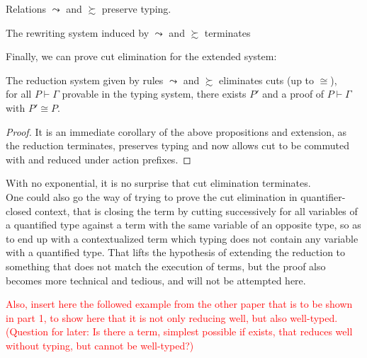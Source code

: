 \begin{corollary}
Relations $\leadsto$ and $\succsim$ preserve typing.
\end{corollary}

\begin{corollary}
The rewriting system induced by $\leadsto$ and $\succsim$ terminates
\end{corollary}

Finally, we can prove cut elimination for the extended system:

\begin{proposition}
The reduction system given by rules $\leadsto$ and $\succsim$ eliminates cuts (up to $\cong$),\\
\ie for all $P\vdash\Gamma$ provable in the typing system, there exists $P'$ and a proof of $P\vdash\Gamma$ with $P'\cong P$.
\end{proposition}

\begin{proof}
It is an immediate corollary of the above propositions and extension, as the reduction terminates, preserves typing and now allows cut to be commuted with and reduced under action prefixes.
\end{proof}

\remark With no exponential, it is no surprise that cut elimination terminates.\\

\remark One could also go the way of trying to prove the cut elimination in quantifier-closed context, that is closing the term by cutting successively for all variables of a quantified type against a term with the same variable of an opposite type, so as to end up with a contextualized term which typing does not contain any variable with a quantified type. That lifts the hypothesis of extending the reduction to something that does not match the execution of terms, but the proof also becomes more technical and tedious, and will not be attempted here.

\textcolor{red}{Also, insert here the followed example from the other paper that is to be shown in part 1, to show here that it is not only reducing well, but also well-typed. (Question for later: Is there a term, simplest possible if exists, that reduces well without typing, but cannot be well-typed?)} %
